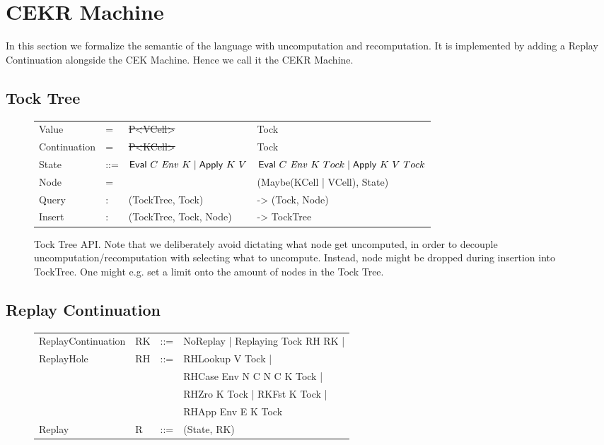 \section{CEKR Machine}
In this section we formalize the semantic of the language with uncomputation and recomputation. It is implemented by adding a Replay Continuation alongside the CEK Machine.
Hence we call it the CEKR Machine.

\subsection{Tock Tree}
\begin{figure}
	\begin{tabular}{p{5em} p{3em} p{10em} p{}}
	Value & = & \st{P<VCell>} & Tock \\
	Continuation & = & \st{P<KCell>} & Tock \\
	State & ::= & \st{$\text{\textsf{Eval}}~C~\mathit{Env}~K \mid \text{\textsf{Apply}}~K~V $} & $\text{\textsf{Eval}}~C~\mathit{Env}~K~Tock \mid \text{\textsf{Apply}}~K~V~Tock $ \\
	Node & = & & (Maybe(KCell | VCell), State) \\
	Query & $:$ & (TockTree, Tock) & -> (Tock, Node) \\
	Insert & $:$ & (TockTree, Tock, Node) & -> TockTree \\
	\end{tabular}
	\caption{Tock Tree API. Note that we deliberately avoid dictating what node get uncomputed, in order to decouple uncomputation/recomputation with selecting what to uncompute. Instead, node might be dropped during insertion into TockTree. One might e.g. set a limit onto the amount of nodes in the Tock Tree. }
\end{figure}

\subsection{Replay Continuation}
\begin{figure}
\begin{tabular}{p{10em} p{2.6em} p{1em} p{}}
	ReplayContinuation & RK & ::= & NoReplay | Replaying Tock RH RK | \\
	ReplayHole & RH & ::= & RHLookup V Tock | \\
	& & & RHCase Env N C N C K Tock | \\
	& & & RHZro K Tock | RKFst K Tock | \\
	& & & RHApp Env E K Tock \\
	Replay & R & ::= & (State, RK) \\
\end{tabular}
\end{figure}

